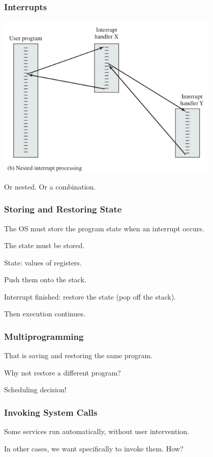 \begin{frame}
	\frametitle{Interrupts}

	\begin{center}
		\includegraphics[width=0.8\textwidth]{images/interrupts-nest.png}
	\end{center}

	Or nested. Or a combination.

\end{frame}

\begin{frame}
	\frametitle{Storing and Restoring State}

	The OS must store the program state when an interrupt occurs.

	The state must be stored.

	State: values of registers.

	Push them onto the stack.

	Interrupt finished: restore the state (pop off the stack).

	Then execution continues.

\end{frame}

\begin{frame}
	\frametitle{Multiprogramming}
	That is saving and restoring the same program.

	Why not restore a different program?

	Scheduling decision!


\end{frame}

\begin{frame}
	\frametitle{Invoking System Calls}

	Some services run automatically, without user intervention.

	In other cases, we want specifically to invoke them. How?

\end{frame}



